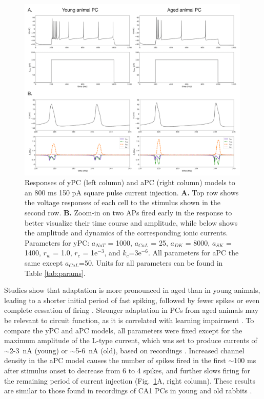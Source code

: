 \documentclass[12pt]{article}
\begin{document}
\begin{figure}[h!]
    \centering
     \includegraphics[width=0.99\textwidth]{figures/fig1.png} 
    \caption{Responses of yPC (left column) and aPC (right column)  models to an 800 ms 150 pA square pulse current injection. \textbf{A.} Top row shows the voltage responses of each cell to the stimulus shown in the second row. \textbf{B.} Zoom-in on two APs fired early in the response to better visualize their time course and amplitude, while below shows the amplitude and dynamics of the corresponding ionic currents. Parameters for yPC: $a_{NaT}$ = 1000, $a_{CaL}$ = 25, $a_{DK}$ = 8000, $a_{SK}$ = 1400, $r_{w}$ = 1.0, $r_{c}$ = 1e$^{-3}$, and $k_{c}$=3e$^{-6}$. All parameters for aPC the same except $a_{CaL}$=50. Units for all parameters can be found in Table \ref{tab:params}.}
    \label{fig:adaptation}
\end{figure}

Studies show that adaptation is more pronounced in aged than in young animals, leading to a shorter initial period of fast spiking, followed by fewer spikes or even complete cessation of firing \citep{disterhoft1996calcium,gant2006early,moyer1992nimodipine,tombaugh2005slow}. Stronger adaptation in PCs from aged animals may be relevant to circuit function, as it is correlated with learning impairment \cite{disterhoft1996calcium,tombaugh2005slow}. To compare the yPC and aPC models, all parameters were fixed except for the maximum amplitude of the L-type {\Ca} current, which was set to produce currents of $\sim$2-3~nA (young) or $\sim$5-6~nA (old), based on recordings \citep{campbell1996aging}. Increased {\Ca} channel density in the aPC model causes the number of spikes fired in the first $\sim$100 ms after stimulus onset to decrease from 6 to 4 spikes, and further slows firing for the remaining period of current injection (Fig.~\ref{fig:adaptation}A, right column). These results are similar to those found in recordings of CA1 PCs in young and old rabbits \citep{moyer1992nimodipine}.
\end{document}
